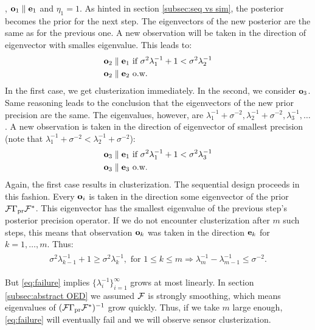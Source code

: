, $\mathbf{o}_1 \parallel \mathbf{e}_1$ and $\eta_1 = 1$. As hinted in
section \ref{subsec:seq vs sim}, the posterior becomes the prior for
the next step. The eigenvectors of the new posterior are the same as
for the previous one. A new observation will be taken in the direction
of eigenvector with smalles eigenvalue. This leads to:
\begin{align*}
  \begin{split}
    \meas_2 \parallel \ev_1  &\text{ if } \sigma^2 \lambda^{-1}_1 + 1 < \sigma^2\lambda^{-1}_2 \\
    \meas_2 \parallel \ev_2  &\text{ o.w. }
  \end{split}
\end{align*}
In the first case, we get clusterization immediately. In the second,
we consider $\mathbf{o}_3$. Same reasoning leads to the conclusion that the
eigenvectors of the new prior precision are the same. The eigenvalues,
however, are $\lambda^{-1}_1 + \sigma^{-2}, \lambda^{-1}_2 +
\sigma^{-2}, \lambda_3^{-1}, \dots$. A new observation is taken in the
direction of eigenvector of smallest precision (note that
$\lambda^{-1}_1 + \sigma^{-2} < \lambda^{-1}_2 + \sigma^{-2}$):
\begin{align*}
  \begin{split}
    \meas_3 \parallel \ev_1 &\text{ if } \sigma^2 \lambda^{-1}_1 + 1 <
    \sigma^2\lambda^{-1}_3 \\
    \meas_3 \parallel  \ev_3  &\text{ o.w. }
  \end{split}
\end{align*}
Again, the first case results in clusterization. The sequential design
proceeds in this fashion. Every $\mathbf{o}_i$ is taken in the direction
some eigenvector of the prior $\mathcal{F} \Gamma_{\textup{pr}}\mathcal{F}^*$. This eigenvector
has the smallest eigenvalue of the previous step's posterior precision
operator. If we do not encounter clusterization after $m$ such steps,
this means that observation $\mathbf{o}_k$ was taken in the direction
$\mathbf{e}_k$ for $k=1,\dots,m$. Thus:
\begin{align}\label{eq:failure}
  \begin{split}
    \sigma^2\lambda_{k-1}^{-1} + 1 \geq \sigma^2\lambda_k^{-1}, \text{ for } 1\leq k \leq m
    \Longrightarrow \lambda_m^{-1} - \lambda_{m-1}^{-1} \leq \sigma^{-2}.
  \end{split}
\end{align}

But \eqref{eq:failure} implies $\{\lambda_i^{-1}\}_{i=1}^{\infty}$
grows at most linearly. In section \ref{subsec:abstract OED} we
assumed $\mathcal{F}$ is strongly smoothing, which means eigenvalues of
$(\mathcal{F} \Gamma_{\textup{pr}}\mathcal{F}^*)^{-1}$ grow quickly. Thus, if we take $m$ large
enough, \eqref{eq:failure} will eventually fail and we will observe
sensor clusterization.


